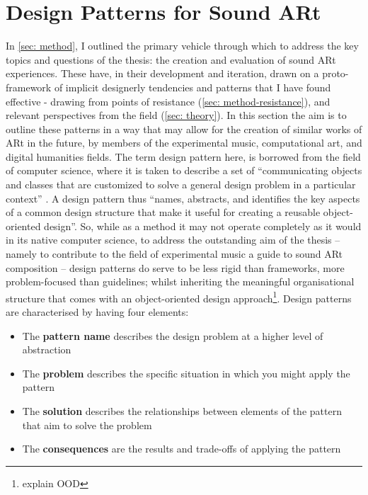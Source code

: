 \section{Design Patterns for Sound ARt} \label{sec: discussion-patterns}
In \autoref{sec: method}, I outlined the primary vehicle through which to address the key topics and questions of the thesis: the creation and evaluation of sound ARt experiences. These have, in their development and iteration, drawn on a proto-framework of implicit designerly tendencies and patterns that I have found effective - drawing from points of resistance (\autoref{sec: method-resistance}), and relevant perspectives from the field (\autoref{sec: theory}). In this section the aim is to outline these patterns in a way that may allow for the creation of similar works of ARt in the future, by members of the experimental music, computational art, and digital humanities fields. The term design pattern here, is borrowed from the field of computer science, where it is taken to describe a set of ``communicating objects and classes that are customized to solve a general design problem in a particular context'' \citep{gamma1995}. A design pattern thus ``names, abstracts, and identifies the key aspects of a common design structure that make it useful for creating a reusable object-oriented design''. So, while as a method it may not operate completely as it would in its native computer science, to address the outstanding aim of the thesis -- namely to contribute to the field of experimental music a guide to sound ARt composition -- design patterns do serve to be less rigid than frameworks, more problem-focused than guidelines; whilst inheriting the meaningful organisational structure that comes with an object-oriented design approach\footnote{explain OOD}. Design patterns are characterised by having four elements:
\begin{itemize}
    \item The \textbf{pattern name} describes the design problem at a higher level of abstraction
    \item The \textbf{problem} describes the specific situation in which you might apply the pattern
    \item The \textbf{solution} describes the relationships between elements of the pattern that aim to solve the problem
    \item The \textbf{consequences} are the results and trade-offs of applying the pattern
\end{itemize}

